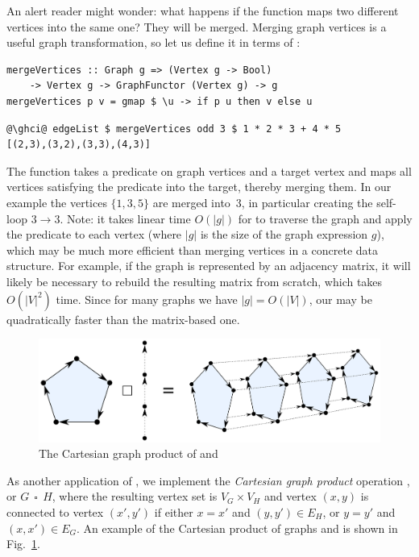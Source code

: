 An alert reader might wonder: what happens if the function maps two different
vertices into the same one? They will be merged. Merging graph vertices is
a useful graph transformation, so let us define it in terms of :

\begin{verbatim}
mergeVertices :: Graph g => (Vertex g -> Bool)
    -> Vertex g -> GraphFunctor (Vertex g) -> g
mergeVertices p v = gmap $ \u -> if p u then v else u
\end{verbatim}
\vspace{-1mm}
\begin{verbatim}
@\ghci@ edgeList $ mergeVertices odd 3 $ 1 * 2 * 3 + 4 * 5
[(2,3),(3,2),(3,3),(4,3)]
\end{verbatim}
\vspace{-1mm}
The function takes a predicate on graph vertices and a target vertex and
maps all vertices satisfying the predicate into the target, thereby
merging them. In our example the  vertices $\{1, 3, 5\}$ are merged
into~3, in particular creating the self-loop $3 \rightarrow 3$. Note: it takes
linear time $O(|g|)$ for  to traverse the graph and apply the
predicate to each vertex (where $|g|$ is the size of the graph expression $g$),
which may be much more efficient than merging vertices in a concrete data
structure. For example, if the graph is represented by an adjacency matrix, it
will likely be necessary to rebuild the resulting matrix from scratch, which
takes $O(|V|^2)$ time. Since for many graphs we have $|g| = O(|V|)$, our
 may be quadratically faster than the matrix-based one.

\begin{figure}
\centerline{\includegraphics[scale=0.36]{fig/graph-product.pdf}}
\caption{The Cartesian graph product of  and \label{fig-product}}
\end{figure}

As another application of , we implement the \emph{Cartesian graph
product} operation , or $G~~\square~~H$, where the resulting vertex set is
$V_G \times V_H$ and vertex $(x, y)$ is connected to vertex $(x', y')$ if
either $x = x'$ and $(y, y') \in E_H$, or $y = y'$ and $(x,x')\in E_G$. An example of the Cartesian product of graphs 
and  is shown in Fig.~\ref{fig-product}.

